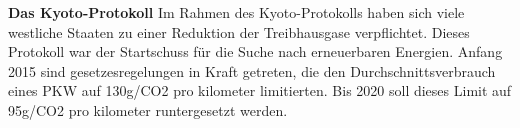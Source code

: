 \textbf{Das Kyoto-Protokoll}
Im Rahmen des Kyoto-Protokolls haben sich viele westliche Staaten zu einer Reduktion der Treibhausgase verpflichtet. 
Dieses Protokoll war der Startschuss für die Suche nach erneuerbaren Energien. 
Anfang 2015 sind gesetzesregelungen in Kraft getreten, die den Durchschnittsverbrauch eines PKW auf 130g/CO2 pro kilometer  limitierten. 
Bis 2020 soll dieses Limit auf 95g/CO2 pro kilometer runtergesetzt werden.



\clearpage %